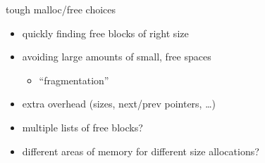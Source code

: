 \begin{frame}{tough malloc/free choices}
    \begin{itemize}
    \item quickly finding free blocks of right size
    \item avoiding large amounts of small, free spaces
        \begin{itemize}
        \item ``fragmentation''
        \end{itemize}
    \item extra overhead (sizes, next/prev pointers, \ldots)
    \vspace{.5cm}
    \item multiple lists of free blocks?
    \item different areas of memory for different size allocations?
    \end{itemize}
\end{frame}
